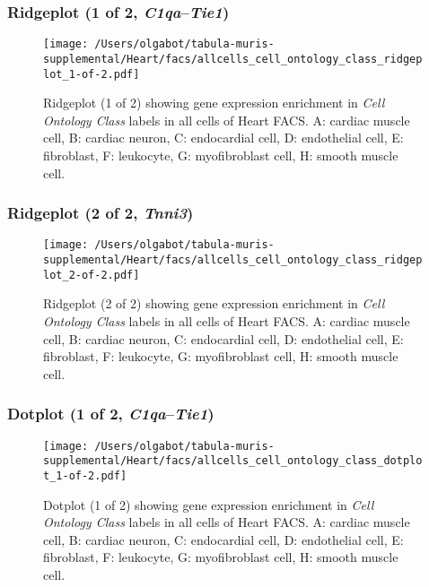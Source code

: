 \clearpage

\subsubsection{Ridgeplot (1 of 2, \emph{C1qa}--\emph{Tie1})}
\begin{figure}[h]
\centering
\texttt{[image: /Users/olgabot/tabula-muris-supplemental/Heart/facs/allcells\_cell\_ontology\_class\_ridgeplot\_1-of-2.pdf]}

\caption{ Ridgeplot (1 of 2)  showing gene expression enrichment in \emph{Cell Ontology Class} labels in all cells of Heart FACS. A: cardiac muscle cell, B: cardiac neuron, C: endocardial cell, D: endothelial cell, E: fibroblast, F: leukocyte, G: myofibroblast cell, H: smooth muscle cell.}
\end{figure}


\clearpage

\subsubsection{Ridgeplot (2 of 2, \emph{Tnni3})}
\begin{figure}[h]
\centering
\texttt{[image: /Users/olgabot/tabula-muris-supplemental/Heart/facs/allcells\_cell\_ontology\_class\_ridgeplot\_2-of-2.pdf]}

\caption{ Ridgeplot (2 of 2)  showing gene expression enrichment in \emph{Cell Ontology Class} labels in all cells of Heart FACS. A: cardiac muscle cell, B: cardiac neuron, C: endocardial cell, D: endothelial cell, E: fibroblast, F: leukocyte, G: myofibroblast cell, H: smooth muscle cell.}
\end{figure}


\clearpage

\subsubsection{Dotplot (1 of 2, \emph{C1qa}--\emph{Tie1})}
\begin{figure}[h]
\centering
\texttt{[image: /Users/olgabot/tabula-muris-supplemental/Heart/facs/allcells\_cell\_ontology\_class\_dotplot\_1-of-2.pdf]}

\caption{ Dotplot (1 of 2)  showing gene expression enrichment in \emph{Cell Ontology Class} labels in all cells of Heart FACS. A: cardiac muscle cell, B: cardiac neuron, C: endocardial cell, D: endothelial cell, E: fibroblast, F: leukocyte, G: myofibroblast cell, H: smooth muscle cell.}
\end{figure}


